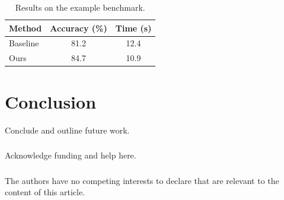 \documentclass[runningheads]{llncs}
\begin{document}
\begin{table}
  \caption{Results on the example benchmark.}
  \label{tab:results}
  \centering
  \begin{tabular}{lcc}
    \toprule
    Method   & Accuracy (\%) & Time (s) \\
    \midrule
    Baseline & 81.2          & 12.4     \\
    Ours     & 84.7          & 10.9     \\
    \bottomrule
  \end{tabular}
\end{table}

\section{Conclusion}
Conclude and outline future work.

\begin{credits}
\subsubsection{\ackname} Acknowledge funding and help here.

\subsubsection{\discintname}
The authors have no competing interests to declare that are relevant to the
content of this article.
\end{credits}


\end{document}
